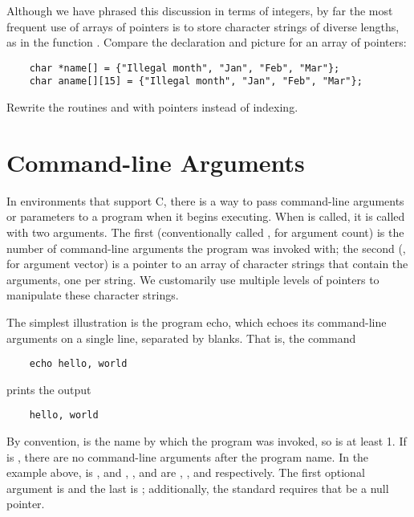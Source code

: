 Although we have phrased this discussion in terms of integers, by far the most frequent use of arrays of pointers is to store character strings of diverse lengths, as in the function .
Compare the declaration and picture for an array of pointers:

\begin{lstlisting}
    char *name[] = {"Illegal month", "Jan", "Feb", "Mar"};
    char aname[][15] = {"Illegal month", "Jan", "Feb", "Mar"};
\end{lstlisting}

\begin{ExerciseList}
\Exercise Rewrite the routines  and  with pointers instead of indexing.
\end{ExerciseList}



\section{Command-line Arguments}


In environments that support C, there is a way to pass command-line arguments or parameters to a program when it begins executing.
When  is called, it is called with two arguments.
The first (conventionally called , for argument count) is the number of command-line arguments the program was invoked with;
the second (, for argument vector) is a pointer to an array of character strings that contain the arguments, one per string.
We customarily use multiple levels of pointers to manipulate these character strings.

The simplest illustration is the program echo, which echoes its command-line arguments on a single line, separated by blanks.
That is, the command
\begin{lstlisting}
    echo hello, world
\end{lstlisting}
prints the output
\begin{lstlisting}
    hello, world
\end{lstlisting}
By convention,  is the name by which the program was invoked, so  is at least 1.
If  is , there are no command-line arguments after the program name.
In the example above,  is , and , , and  are , , and  respectively.
The first optional argument is  and the last is ; additionally, the standard requires that  be a null pointer.

